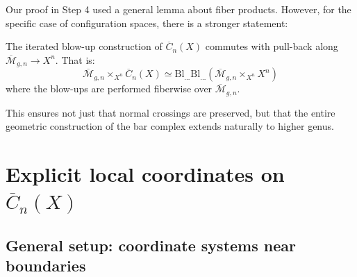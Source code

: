 \begin{remark}\label{rem:iterated-blowup}
Our proof in Step 4 used a general lemma about fiber products. However, for the specific
case of configuration spaces, there is a stronger statement:

The iterated blow-up construction of $\overline{C}_n(X)$ commutes with pull-back along $\overline{\mathcal{M}}_{g,n} \to X^n$. That is:
\[\overline{\mathcal{M}}_{g,n} \times_{X^n} \overline{C}_n(X) \simeq 
\text{Bl}_{\ldots} \text{Bl}_{\ldots} (\overline{\mathcal{M}}_{g,n} \times_{X^n} X^n)\]
where the blow-ups are performed fiberwise over $\overline{\mathcal{M}}_{g,n}$.

This ensures not just that normal crossings are preserved, but that the entire geometric 
construction of the bar complex extends naturally to higher genus.
\end{remark}
\section{\texorpdfstring{Explicit local coordinates on $\overline{C}_n(X)$}{Explicit local coordinates on C n(X)}}
\label{sec:explicit-coordinates-complete}

\subsection{General setup: coordinate systems near boundaries}

